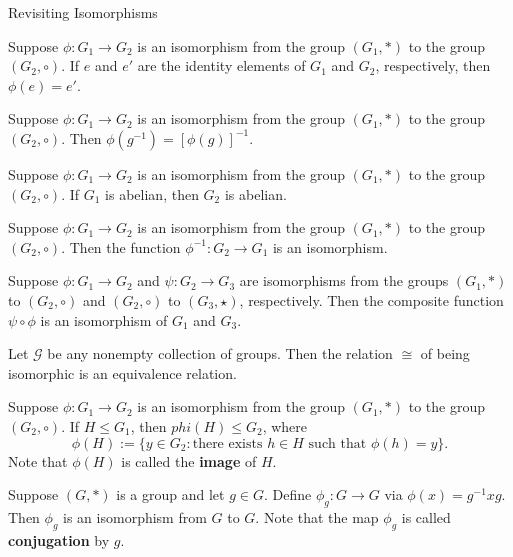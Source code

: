 \begin{section}{Revisiting Isomorphisms}
\begin{theorem}\label{thm:hom_id}
Suppose $\phi:G_1\to G_2$ is an isomorphism from the group $(G_1,*)$ to the group $(G_2,\circ)$.  If $e$ and $e'$ are the identity elements of $G_1$ and $G_2$, respectively, then $\phi(e)=e'$.
\end{theorem}

\begin{theorem}\label{thm:hom_inverse}
Suppose $\phi:G_1\to G_2$ is an isomorphism from the group $(G_1,*)$ to the group $(G_2,\circ)$.   Then $\phi(g^{-1})=[\phi(g)]^{-1}$.
\end{theorem}

\begin{theorem}
Suppose $\phi:G_1\to G_2$ is an isomorphism from the group $(G_1,*)$ to the group $(G_2,\circ)$. If $G_1$ is abelian, then $G_2$ is abelian.
\end{theorem}

\begin{theorem}
Suppose $\phi:G_1\to G_2$ is an isomorphism from the group $(G_1,*)$ to the group $(G_2,\circ)$. Then the function $\phi^{-1}:G_2\to G_1$ is an isomorphism.
\end{theorem}

\begin{theorem}
Suppose $\phi:G_1\to G_2$ and $\psi:G_2\to G_3$ are isomorphisms from the groups $(G_1,*)$ to $(G_2,\circ)$ and $(G_2,\circ)$ to $(G_3,\star)$, respectively. Then the composite function $\psi\circ\phi$ is an isomorphism of $G_1$ and $G_3$.
\end{theorem}

\begin{theorem}
Let $\mathcal{G}$ be any nonempty collection of groups.  Then the relation $\cong$ of being isomorphic is an equivalence relation.
\end{theorem}

\begin{theorem}
Suppose $\phi:G_1\to G_2$ is an isomorphism from the group $(G_1,*)$ to the group $(G_2,\circ)$.  If $H\leq G_1$, then $phi(H)\leq G_2$, where
\[
\phi(H):=\{y\in G_2:\text{there exists } h\in H\text{ such that }\phi(h)=y\}. 
\]
Note that $\phi(H)$ is called the \textbf{image} of $H$.
\end{theorem}

\begin{theorem}
Suppose $(G,*)$ is a group and let $g\in G$.  Define $\phi_g:G\to G$ via $\phi(x)=g^{-1}xg$.  Then $\phi_g$ is an isomorphism from $G$ to $G$.  Note that the map $\phi_g$ is called \textbf{conjugation} by $g$.
\end{theorem}


\end{section}
